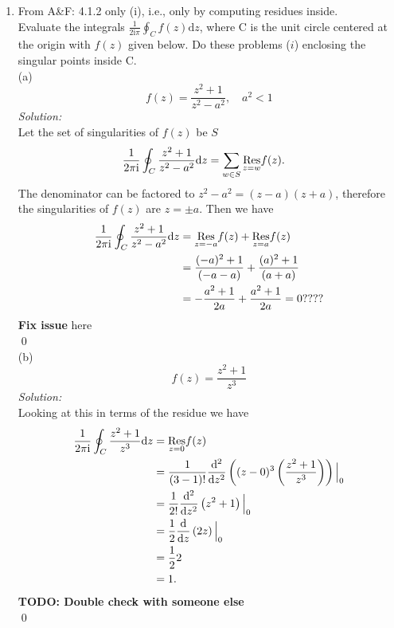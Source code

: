 \documentclass[10pt]{amsart}
\newcommand{\D}{\mathrm{d}}
\newcommand{\I}{\mathrm{i}}
\theoremstyle{nonumberplain}
\begin{document}
\mline
\begin{enumerate}[label={\bf {\arabic*}:}]
\item From A\&F: 4.1.2 only (i), i.e., only by computing residues inside.\\
Evaluate the integrals $\frac 1 {2 \I \pi} \oint_C f(z) \D z$, where C is the unit circle centered at the origin with $f(z)$ given below.
Do these problems ($i$) enclosing the singular points inside C. \\

\noindent
(a)
$$
f(z) = \frac {z^2 + 1}{ z^2 - a^2 }, \quad a^2 < 1
$$
\textit{Solution:} \\
Let the set of singularities of $f(z)$ be $S$
\begin{align*}
\frac 1 {2 \pi \I} \oint_C \frac {z^2 + 1}{ z^2 - a^2 } \D z
	&= \sum_{w \in S} \underset{z=w}{\rm Res} f(z).
\end{align*}
The denominator can be factored to $z^2 - a^2 = (z - a)(z + a)$, therefore the singularities of $f(z)$ are $z = \pm a$.
Then we have
\begin{align*}
\frac 1 {2 \pi \I} \oint_C \frac {z^2 + 1}{ z^2 - a^2 } \D z
	&= \underset{z=-a}{\rm Res} f(z) + \underset{z=a}{\rm Res} f(z) \\
	&= \frac {(-a)^2 + 1}{ (-a - a) } + \frac {(a)^2 + 1}{ (a +a) } \\
	&= - \frac {a^2 + 1}{ 2a } + \frac {a^2 + 1}{ 2a } = 0????
\end{align*}
\textbf{Fix issue} here \\
\qed \\

\noindent
(b)
$$
f(z) = \frac {z^2 + 1}{ z^3 }
$$
\textit{Solution:} \\
Looking at this in terms of the residue we have
\begin{align*}
\frac 1 {2 \pi \I} \oint_C \frac {z^2 + 1}{ z^3 } \D z
	&= \underset{z=0}{\rm Res} f(z) \\
	&= \frac 1 {(3 - 1)!} \frac {\D^2} {\D z^2} \left( (z - 0)^3\left( \frac {z^2 + 1}{ z^3 } \right) \right) \Big|_0 \\
	&= \frac 1 {2!} \frac {\D^2} {\D z^2} \left( z^2 + 1 \right) \Big|_0 \\
	&= \frac 1 2 \frac {\D} {\D z} \left( 2z \right) \Big|_0 \\
	&= \frac 1 2 2  \\
	&= 1.
\end{align*}
\textbf{TODO: Double check with someone else} \\
\qed \\


\end{enumerate}
\end{document}

